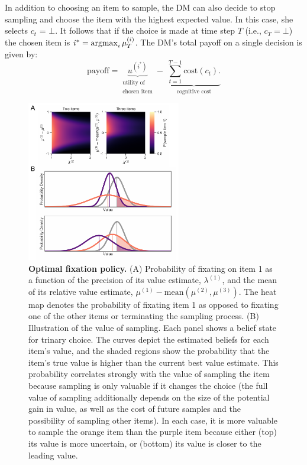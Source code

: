 In addition to choosing an item to sample, the DM can also decide
to stop sampling and choose the item with the highest expected value. In this case, she selects $c_t$ = $\bot$. It follows that if the choice is made at time step $T$ (i.e., $c_T = \bot$) the chosen item is $i^* = \operatorname*{argmax}_i \mu_T^{(i)}$. The DM's total payoff on a single decision is given by:
\begin{equation}
  \label{eq:objective}
  \text{payoff} = 
        \underbrace{u^{(i^*)}}_{
    \substack{\text{utility of} \\ \text{chosen item}}
  } -\;
  \underbrace{\sum_{t=1}^{T-1}\text{cost}(c_t).}_\text{cognitive cost}
\end{equation}



\begin{figure}[tb!]
  \centering
  \includegraphics[width=0.6\textwidth]{figs/attention/Fig2.pdf}
  \caption{\textbf{Optimal fixation policy.}
  (A) Probability of fixating on item 1 as a function of the precision of its value estimate, $\lambda^{(1)}$, and the mean of its relative value estimate, $\mu^{(1)}-\mathrm{mean}(\mu^{(2)},\mu^{(3)})$. The heat map denotes the probability of fixating item 1 as opposed to fixating one of the other items or terminating the sampling process.
  (B) Illustration of the value of sampling. Each panel shows a belief state for trinary choice. The curves depict the estimated beliefs for each item's value, and the shaded regions show the probability that the item's true value is higher than the current best value estimate. This probability correlates strongly with the value of sampling the item because sampling is only valuable if it changes the choice (the full value of sampling additionally depends on the size of the potential gain in value, as well as the cost of future samples and the possibility of sampling other items). In each case, it is more valuable to sample the orange item than the purple item because either (top) its value is more uncertain, or (bottom) its value is closer to the leading value.
  }
  \label{fig2}
\end{figure}



